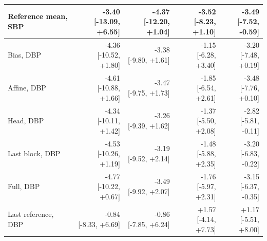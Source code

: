 \documentclass[11pt]{article}
\begin{document}
\begin{table}[t]
\begin{tabular}{lrrrr}
Reference mean, SBP & \shortstack{-3.40\\{[-13.09, +6.55]}} & \shortstack{-4.37\\{[-12.20, +1.04]}} & \shortstack{-3.52\\{[-8.23, +1.10]}} & \shortstack{-3.49\\{[-7.52, -0.59]}}\\
\midrule
Bias, DBP & \shortstack{-4.36\\{[-10.52, +1.80]}} & \shortstack{-3.38\\{[-9.80, +1.61]}} & \shortstack{-1.15\\{[-6.28, +3.40]}} & \shortstack{-3.20\\{[-7.48, +0.19]}}\\
Affine, DBP & \shortstack{-4.61\\{[-10.88, +1.66]}} & \shortstack{-3.47\\{[-9.75, +1.73]}} & \shortstack{-1.85\\{[-6.54, +2.61]}} & \shortstack{-3.48\\{[-7.76, +0.10]}}\\
Head, DBP & \shortstack{-4.34\\{[-10.11, +1.42]}} & \shortstack{-3.26\\{[-9.39, +1.62]}} & \shortstack{-1.37\\{[-5.50, +2.08]}} & \shortstack{-2.82\\{[-5.81, -0.11]}}\\
Last block, DBP & \shortstack{-4.53\\{[-10.26, +1.19]}} & \shortstack{-3.19\\{[-9.52, +2.14]}} & \shortstack{-1.48\\{[-5.88, +2.35]}} & \shortstack{-3.20\\{[-6.83, -0.22]}}\\
Full, DBP & \shortstack{-4.77\\{[-10.22, +0.67]}} & \shortstack{-3.49\\{[-9.92, +2.07]}} & \shortstack{-1.76\\{[-5.97, +2.31]}} & \shortstack{-3.15\\{[-6.37, -0.35]}}\\
Last reference, DBP & \shortstack{-0.84\\{[-8.33, +6.69]}} & \shortstack{-0.86\\{[-7.85, +6.24]}} & \shortstack{+1.57\\{[-4.14, +7.73]}} & \shortstack{+1.17\\{[-5.51, +8.00]}}\\

\end{tabular}
\end{table}
\end{document}

